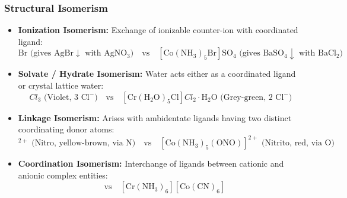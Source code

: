 \documentclass[10pt,a4paper]{article}
\begin{document}
\subsubsection{Structural Isomerism}
\begin{itemize}
  \item \textbf{Ionization Isomerism:} Exchange of ionizable counter-ion with coordinated ligand:
  \begin{equation}
    [\mathrm{Co(NH_3)_5SO_4}]\mathrm{Br}\text{ (gives }\mathrm{AgBr\downarrow}\text{ with }\mathrm{AgNO_3}) \quad \text{vs} \quad [\mathrm{Co(NH_3)_5Br}]\mathrm{SO_4}\text{ (gives }\mathrm{BaSO_4\downarrow}\text{ with }\mathrm{BaCl_2})
  \end{equation}
  \item \textbf{Solvate / Hydrate Isomerism:} Water acts either as a coordinated ligand or crystal lattice water:
  \begin{equation}
    [\mathrm{Cr(H_2O)_6}]Cl_3\text{ (Violet, 3 }\mathrm{Cl^-}) \quad \text{vs} \quad [\mathrm{Cr(H_2O)_5Cl}]Cl_2\cdot \mathrm{H_2O}\text{ (Grey-green, 2 }\mathrm{Cl^-})
  \end{equation}
  \item \textbf{Linkage Isomerism:} Arises with ambidentate ligands having two distinct coordinating donor atoms:
  \begin{equation}
    [\mathrm{Co(NH_3)_5(NO_2)}]^{2+}\text{ (Nitro, yellow-brown, via N)} \quad \text{vs} \quad [\mathrm{Co(NH_3)_5(ONO)}]^{2+}\text{ (Nitrito, red, via O)}
  \end{equation}
  \item \textbf{Coordination Isomerism:} Interchange of ligands between cationic and anionic complex entities:
  \begin{equation}
    [\mathrm{Co(NH_3)_6}][\mathrm{Cr(CN)_6}] \quad \text{vs} \quad [\mathrm{Cr(NH_3)_6}][\mathrm{Co(CN)_6}]
  \end{equation}
\end{itemize}
\end{document}
